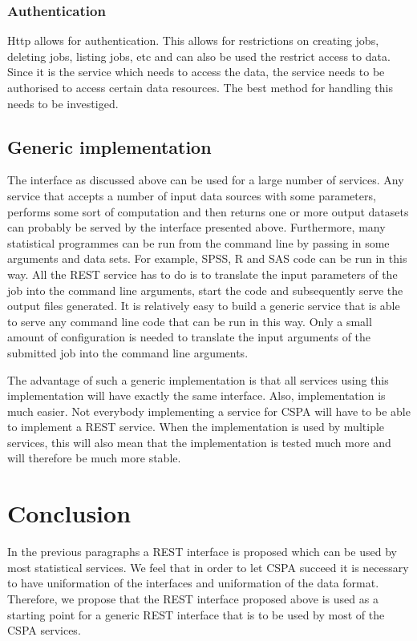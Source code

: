 \documentclass[a4paper]{article}
\begin{document}
\subsubsection{Authentication}
Http allows for authentication. This allows for restrictions on creating jobs,
deleting jobs, listing jobs, etc and can also be used the restrict access to
data. Since it is the service which needs to access the data, the service needs
to be authorised to access certain data resources. The best method for handling
this needs to be investiged. 


\subsection{Generic implementation}
The interface as discussed above can be used for a large number of services. Any
service that accepts a number of input data sources with some parameters,
performs some sort of computation and then returns one or more output datasets
can probably be served by the interface presented above. Furthermore, many
statistical programmes can be run from the command line by passing in some
arguments and data sets. For example, SPSS, R and SAS code can be run in this
way. All the REST service has to do is to translate the input parameters of the
job into the command line arguments, start the code and subsequently serve the
output files generated.  It is relatively easy to build a generic service that
is able to serve any command line code that can be run in this way. Only a small
amount of configuration is needed to translate the input arguments of the
submitted job into the command line arguments. 

The advantage of such a generic implementation is that all services using this
implementation will have exactly the same interface. Also, implementation is
much easier. Not everybody implementing a service for CSPA will have to be able
to implement a REST service. When the implementation is used by multiple
services, this will also mean that the implementation is tested much more and
will therefore be much more stable. 




\section{Conclusion}

In the previous paragraphs a REST interface is proposed which can be used by
most statistical services. We feel that in order to let CSPA succeed it is
necessary to have uniformation of the interfaces and uniformation of the data
format. Therefore, we propose that the REST interface proposed above is used as
a starting point for a generic REST interface that is to be used by most of the
CSPA services. 



\end{document}

